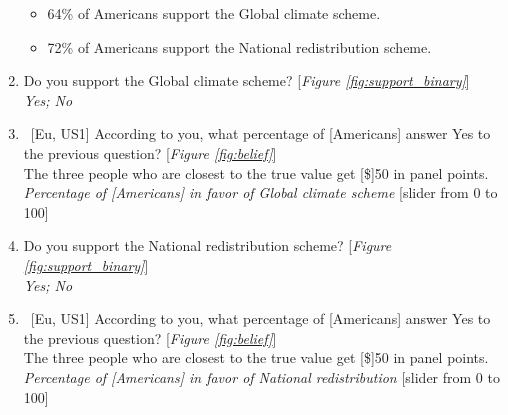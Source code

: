\begin{enumerate}[resume]
\begin{itemize} 
    \item 64\% of Americans support the Global climate scheme. 	
    \item 72\% of Americans support the National redistribution scheme. 
\end{itemize}
\item \label{q:gcs_support} Do you support the Global climate scheme? [\textit{Figure \ref{fig:support_binary}}]
\\ \textit{Yes; No}
\item ~[Eu, US1] \label{q:gcs_belief} According to you, what percentage of [Americans] answer Yes to the previous question? [\textit{Figure \ref{fig:belief}}]\\
The three people who are closest to the true value get [\$]50 in panel points.
\\ \textit{Percentage of [Americans] in favor of Global climate scheme} [slider from 0 to 100]
\item \label{q:nr_support} Do you support the National redistribution scheme? [\textit{Figure \ref{fig:support_binary}}]
\\ \textit{Yes; No}
\item ~[Eu, US1] \label{q:nr_belief} According to you, what percentage of [Americans] answer Yes to the previous question? [\textit{Figure \ref{fig:belief}}]\\
The three people who are closest to the true value get [\$]50 in panel points.
\\ \textit{Percentage of [Americans] in favor of National redistribution } [slider from 0 to 100]

\end{enumerate}
